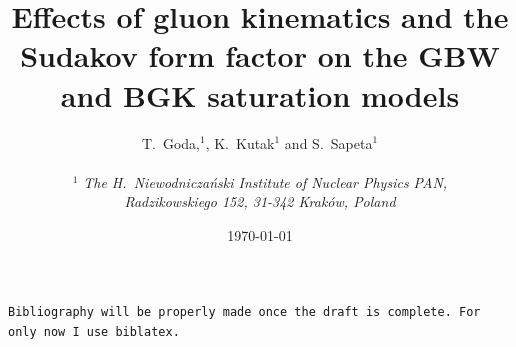 \documentclass[12pt]{article}
\author{
T.~Goda,$^1$, K.~Kutak$^{1}$ and S.~Sapeta$^1$\\\,\\
$^1$ 
{\small\it The H.\ Niewodnicza\'nski Institute of Nuclear Physics PAN,}\\ 
{\small\it Radzikowskiego 152, 31-342 Krak\'ow, Poland}\\%
}
\title{Effects of gluon kinematics and the Sudakov form factor on the GBW and BGK saturation models}
\date{\today}
\numberwithin{equation}{section}
\numberwithin{table}{section}
\numberwithin{figure}{section}
\newcommand{\comment}[1]{\texttt{\color{red}#1}}
\begin{document}
\maketitle

\vspace{-25em}
\begin{flushright}
\end{flushright}
\vspace{20em}

\begin{abstract}
  
\end{abstract}
%
%
\comment{Bibliography will be properly made once the draft is complete. For only now I use biblatex.}
\end{document}
